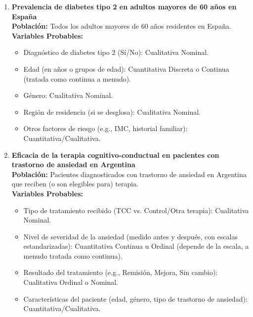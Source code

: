 \documentclass[12pt, letterpaper]{article}
\begin{document}
\begin{enumerate}
\item \textbf{Prevalencia de diabetes tipo 2 en adultos mayores de 60 años en España} \\
\textbf{Población:} Todos los adultos mayores de 60 años residentes en España. \\
\textbf{Variables Probables:}
\begin{itemize}
  \item Diagnóstico de diabetes tipo 2 (Sí/No): Cualitativa Nominal.
  \item Edad (en años o grupos de edad): Cuantitativa Discreta o Continua (tratada como continua a menudo).
  \item Género: Cualitativa Nominal.
  \item Región de residencia (si se desglosa): Cualitativa Nominal.
  \item Otros factores de riesgo (e.g., IMC, historial familiar): Cuantitativa/Cualitativa.
\end{itemize}

\item \textbf{Eficacia de la terapia cognitivo-conductual en pacientes con trastorno de ansiedad en Argentina} \\
\textbf{Población:} Pacientes diagnosticados con trastorno de ansiedad en Argentina que reciben (o son elegibles para) terapia. \\
\textbf{Variables Probables:}
\begin{itemize}
  \item Tipo de tratamiento recibido (TCC vs. Control/Otra terapia): Cualitativa Nominal.
  \item Nivel de severidad de la ansiedad (medido antes y después, con escalas estandarizadas): Cuantitativa Continua u Ordinal (depende de la escala, a menudo tratada como continua).
  \item Resultado del tratamiento (e.g., Remisión, Mejora, Sin cambio): Cualitativa Ordinal o Nominal.
  \item Características del paciente (edad, género, tipo de trastorno de ansiedad): Cuantitativa/Cualitativa.
\end{itemize}


\end{enumerate}
\end{document}
